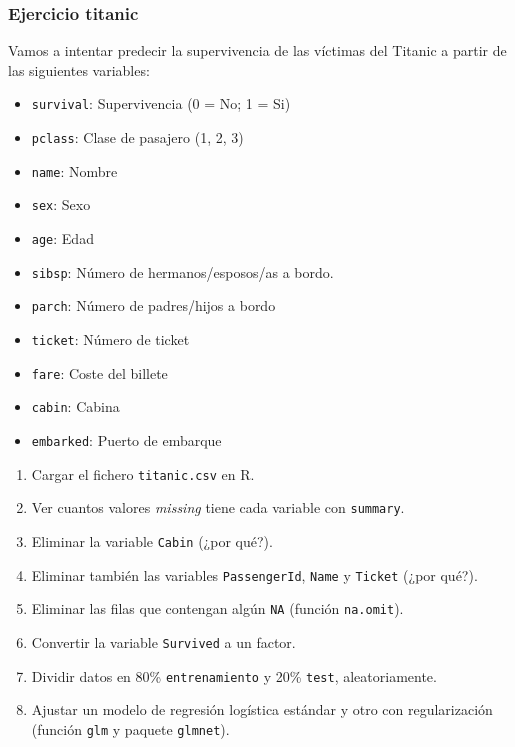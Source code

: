 \documentclass{beamer}
\begin{document}
\begin{frame}[allowframebreaks]
\frametitle{Ejercicio titanic}

Vamos a intentar predecir la supervivencia de las víctimas del Titanic a partir de las siguientes variables:

\begin{itemize}
\item \texttt{survival}:  Supervivencia (0 = No; 1 = Si)
\item \texttt{pclass}:   Clase de pasajero (1, 2, 3)
\item \texttt{name}:      Nombre
\item \texttt{sex}:           Sexo
\item \texttt{age}:          Edad
\item \texttt{sibsp}:           Número de hermanos/esposos/as a bordo.
\item \texttt{parch}:          Número de padres/hijos a bordo
\item \texttt{ticket}:          Número de ticket
\item \texttt{fare}:         Coste del billete
\item \texttt{cabin}:          Cabina
\item \texttt{embarked}:        Puerto de embarque
\end{itemize}

\break

\begin{enumerate}
\item Cargar el fichero \texttt{titanic.csv} en R.
\item Ver cuantos valores \textit{missing} tiene cada variable con \texttt{summary}.
\item Eliminar la variable \texttt{Cabin} (¿por qué?).
\item Eliminar también las variables \texttt{PassengerId}, \texttt{Name} y \texttt{Ticket} (¿por qué?).
\item Eliminar las filas que contengan algún \texttt{NA} (función \texttt{na.omit}).
\item Convertir la variable \texttt{Survived} a un factor.
\item Dividir datos en 80\% \texttt{entrenamiento} y 20\% \texttt{test}, aleatoriamente.
\item Ajustar un modelo de regresión logística estándar y otro con regularización (función \texttt{glm} y paquete \texttt{glmnet}).
\end{enumerate}
\end{frame}
\end{document}
